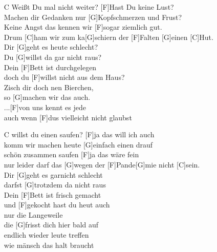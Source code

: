 \def\Titel{Die Bänd ist auch nur ein Mänsch}
\def\Interpret{Die BÄND}
\def\Referenz{Ein Lied für schlimme Zeiten}

\LiedSetup{}

\begin{guitarMagic}
    \begin{enumerate}

        \item [C]Weißt Du mal nicht weiter? [F]Hast Du keine Lust? \\
            [C]Machen dir Gedanken nur [G]Kopfschmerzen und Frust? \\
            [C]Keine Angst das kennen wir [F]sogar ziemlich gut. \\
            Drum [C]ham wir zum ka[G]schiern der [F]Falten [G]einen [C]Hut. \\
            Dir [G]geht es heute schlecht? \\
            Du [G]willst da gar nicht raus?\\
            Dein [F]Bett ist durchgelegen \\
            doch du [F]willst nicht aus dem Haus?\\
            [G]Zisch dir doch nen Bierchen, \\
            so [G]machen wir das auch.\\
            ...[F]von uns kennt es jede \\
            auch wenn [F]dus vielleicht  nicht  glaubst\\
            \liedweiter

        \item [C]willst du einen saufen? [F]ja das will ich auch\\
            [C]komm wir machen heute [G]einfach einen drauf\\
            [C]schön zusammen saufen [F]ja das wäre fein\\
            [C]nur leider darf das [G]wegen der [F]Pande[G]mie nicht [C]sein.\\
            Dir [G]geht es garnicht schlecht\\
            darfst [G]trotzdem da nicht raus\\
            Dein [F]Bett ist frisch gemacht \\
            und [F]gekocht hast du heut auch\\
            [G]nur die Langeweile \\
            die [G]frisst dich hier bald auf\\
            [F]endlich wieder leute treffen \\
            [F]wie mänsch das halt braucht


\end{enumerate}
\end{guitarMagic}
